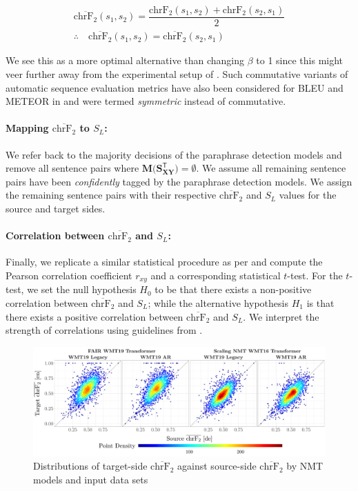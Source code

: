 \documentclass[11pt,a4paper]{article}
\begin{document}
\begin{gather}
  \overline{\text{chrF}_2}(s_1,s_2) = \dfrac{\text{chrF}_2(s_1,s_2) + \text{chrF}_2(s_2,s_1)}{2} \\[5pt]
  \therefore \quad \overline{\text{chrF}_2}(s_1,s_2) = \overline{\text{chrF}_2}(s_2,s_1)
\end{gather}

We see this as a more optimal alternative than changing $\beta$ to 1 since this might veer further away from the experimental setup of \citet{michel2019evaluation}. Such commutative variants of automatic sequence evaluation metrics have also been considered for BLEU and METEOR in \citet{wieting-etal-2019-beyond} and were termed \textit{symmetric} instead of commutative.

\paragraph{Mapping $\overline{\text{chrF}_2}$ to $S_L$:}
We refer back to the majority decisions of the paraphrase detection models and remove all sentence pairs where $\mathbf{M(S_{XY}^{\mathsf{T}}}) = \emptyset$. We assume all remaining sentence pairs have been \textit{confidently} tagged by the paraphrase detection models. We assign the remaining sentence pairs with their respective $\overline{\text{chrF}_2}$ and $S_L$ values for the source and target sides. 

\paragraph{Correlation between $\overline{\text{chrF}_2}$ and $S_L$:} Finally, we replicate a similar statistical procedure as per \citet{michel2019evaluation} and compute the Pearson correlation coefficient $r_{xy}$ and a corresponding statistical $t$-test. For the $t$-test, we set the null hypothesis $H_0$ to be that there exists a non-positive correlation between $\overline{\text{chrF}_2}$ and $S_L$; while the alternative hypothesis $H_1$ is that there exists a positive correlation between $\overline{\text{chrF}_2}$ and $S_L$. We interpret the strength of correlations using guidelines from \citet{schober2018correlation}.     

\begin{figure}
  \centering 
  \includegraphics[trim={0cm 0cm 0cm 0cm},clip,width=\textwidth]{chrf_nmt.pdf}
  \caption{Distributions of target-side $\overline{\text{chrF}_2}$ against source-side $\overline{\text{chrF}_2}$ by NMT models and input data sets}
  \label{chrf_distribution}
\end{figure}
\end{document}

